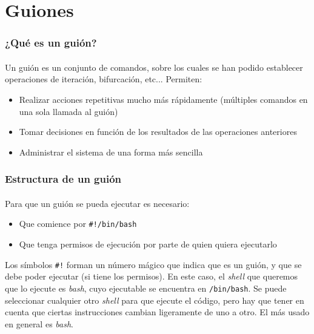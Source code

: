 \documentclass[12pt]{beamer}
\begin{document}
\section{Guiones}

\begin{frame}
  \frametitle{¿Qué es un guión?}
  \framesubtitle{}
  Un guión es un conjunto de comandos, sobre los cuales se han podido establecer operaciones de iteración, bifurcación, etc... Permiten:
  \medskip\linebreak
  \begin{itemize}
    \item Realizar acciones repetitivas mucho más rápidamente (múltiples comandos en una sola llamada al guión)
    \medskip
    \item Tomar decisiones en función de los resultados de las operaciones anteriores
    \medskip
    \item Administrar el sistema de una forma más sencilla
  \end{itemize}
\end{frame}

\begin{frame}
  \frametitle{Estructura de un guión}
  \framesubtitle{}
  Para que un guión se pueda ejecutar es necesario:
  \medskip
  \begin{itemize}
    \item Que comience por \texttt{\#!/bin/bash}
    \medskip
    \item Que tenga permisos de ejecución por parte de quien quiera ejecutarlo
  \end{itemize}
  \medskip
  Los símbolos \texttt{\#!} forman un número mágico que indica que es un guión, y que se debe poder ejecutar (si tiene los permisos). En este caso, el \textit{shell} que queremos que lo ejecute es \textit{bash}, cuyo ejecutable se encuentra en \texttt{/bin/bash}.
  \medskip\linebreak
  Se puede seleccionar cualquier otro \textit{shell} para que ejecute el código, pero hay que tener en cuenta que ciertas instrucciones cambian ligeramente de uno a otro. El más usado en general es \textit{bash}.
\end{frame}
\end{document}

